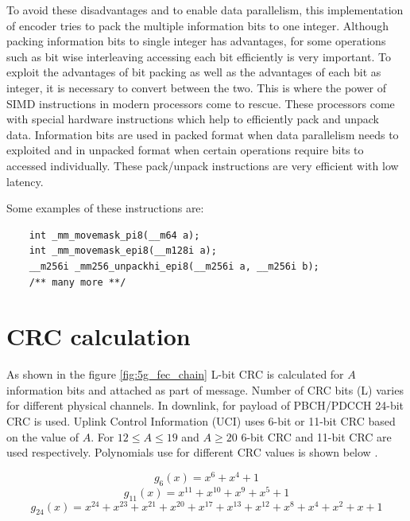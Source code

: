 To avoid these disadvantages and to enable data parallelism, this implementation of encoder tries to pack the multiple information bits to one integer. Although packing information bits to single integer has advantages, for some operations such as bit wise interleaving accessing each bit efficiently is very important. To exploit the advantages of bit packing as well as the advantages of each bit as integer, it is necessary to convert between the two. This is where the power of SIMD instructions in modern processors come to rescue. These processors come with special hardware instructions which help to efficiently pack and unpack data. Information bits are used in packed format when data parallelism needs to exploited and in unpacked format when certain operations require bits to accessed individually. These pack/unpack instructions are very efficient with low latency.

Some examples of these instructions are:
\begin{verbatim}
	int _mm_movemask_pi8(__m64 a);
	int _mm_movemask_epi8(__m128i a);
	__m256i _mm256_unpackhi_epi8(__m256i a, __m256i b);
	/** many more **/
\end{verbatim}



\section{CRC calculation}
As shown in the figure \ref{fig:5g_fec_chain} L-bit CRC is calculated for $A$ information bits and attached as part of message. Number of CRC bits (L) varies for different physical channels. In downlink, for payload of PBCH/PDCCH 24-bit CRC is used. Uplink Control Information (UCI) uses 6-bit or 11-bit CRC based on the value of $A$. For $12 \leq A \leq 19$ and $A \geq 20$ 6-bit CRC and 11-bit CRC are used respectively. Polynomials use for different CRC values is shown below \cite{3gpp.38.212}.

\begin{equation} \label{crc_polynomial6}
g_{6}(x) = x^{6} + x^{4} + 1
\end{equation}
\begin{equation} \label{crc_polynomial11}
g_{11}(x) = x^{11} + x^{10} + x^{9} + x^{5} + 1
\end{equation}
\begin{equation} \label{crc_polynomial24}
g_{24}(x) = x^{24} + x^{23} + x^{21} + x^{20} + x^{17} + x^{13} + x^{12} + x^{8} + x^{4} + x^{2} + x + 1
\end{equation}

